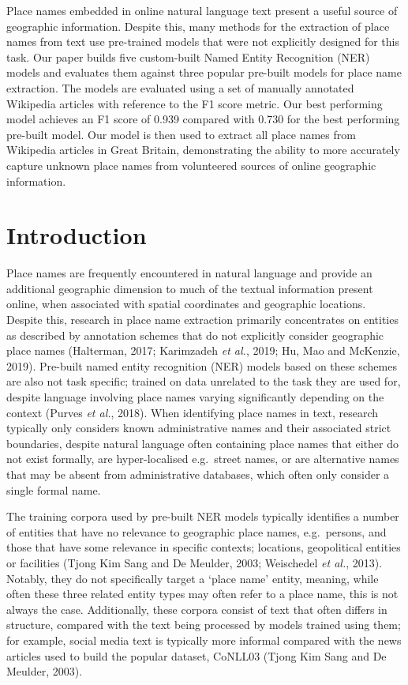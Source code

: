 \documentclass[
  letterpaper,
  11pt,
  english,
  onehalfspacing,
  headsepline]{MastersDoctoralThesis}
\begin{document}

Place names embedded in online natural language text present a useful
source of geographic information. Despite this, many methods for the
extraction of place names from text use pre-trained models that were not
explicitly designed for this task. Our paper builds five custom-built
Named Entity Recognition (NER) models and evaluates them against three
popular pre-built models for place name extraction. The models are
evaluated using a set of manually annotated Wikipedia articles with
reference to the F1 score metric. Our best performing model achieves an
F1 score of 0.939 compared with 0.730 for the best performing pre-built
model. Our model is then used to extract all place names from Wikipedia
articles in Great Britain, demonstrating the ability to more accurately
capture unknown place names from volunteered sources of online
geographic information.

\newpage

\hypertarget{introduction-1}{%
\section{Introduction}\label{introduction-1}}

Place names are frequently encountered in natural language and provide
an additional geographic dimension to much of the textual information
present online, when associated with spatial coordinates and geographic
locations. Despite this, research in place name extraction primarily
concentrates on entities as described by annotation schemes that do not
explicitly consider geographic place names (Halterman, 2017; Karimzadeh
\emph{et al.}, 2019; Hu, Mao and McKenzie, 2019). Pre-built named entity
recognition (NER) models based on these schemes are also not task
specific; trained on data unrelated to the task they are used for,
despite language involving place names varying significantly depending
on the context (Purves \emph{et al.}, 2018). When identifying place
names in text, research typically only considers known administrative
names and their associated strict boundaries, despite natural language
often containing place names that either do not exist formally, are
hyper-localised e.g.~street names, or are alternative names that may be
absent from administrative databases, which often only consider a single
formal name.

The training corpora used by pre-built NER models typically identifies a
number of entities that have no relevance to geographic place names,
e.g.~persons, and those that have some relevance in specific contexts;
locations, geopolitical entities or facilities (Tjong Kim Sang and De
Meulder, 2003; Weischedel \emph{et al.}, 2013). Notably, they do not
specifically target a `place name' entity, meaning, while often these
three related entity types may often refer to a place name, this is not
always the case. Additionally, these corpora consist of text that often
differs in structure, compared with the text being processed by models
trained using them; for example, social media text is typically more
informal compared with the news articles used to build the popular
dataset, CoNLL03 (Tjong Kim Sang and De Meulder, 2003).
\end{document}
